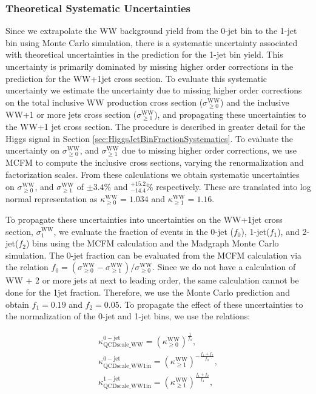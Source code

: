\subsubsection{Theoretical Systematic Uncertainties} 
Since we extrapolate the WW background yield from the 0-jet bin to the 1-jet bin using Monte Carlo
simulation, there is a systematic uncertainty associated with theoretical uncertainties in
the prediction for the 1-jet bin yield. This uncertainty is primarily dominated by missing higher
order corrections in the prediction for the WW+1jet cross section. To evaluate this systematic 
uncertainty we estimate the uncertainty due to missing higher order corrections on the
total inclusive WW production cross section ($\sigma^{\mathrm{WW}}_{\geq 0}$) and the inclusive 
WW+1 or more jets cross section ($\sigma^{\mathrm{WW}}_{\geq 1}$), and propagating these uncertainties 
to the WW+1 jet cross section. The procedure is described in greater detail for the Higgs signal
in Section \ref{sec:HiggsJetBinFractionSystematics}. To evaluate the uncertainty on 
$\sigma^{\mathrm{WW}}_{\geq 0}$, and $\sigma^{\mathrm{WW}}_{\geq 1}$ due to missing higher 
order corrections, we use MCFM \cite{MCFMVVProduction} to compute the inclusive cross sections, 
varying the renormalization and factorization scales. From these calculations we obtain 
systematic uncertainties on $\sigma^{\mathrm{WW}}_{\geq 0}$, and 
$\sigma^{\mathrm{WW}}_{\geq 1}$ of $\pm 3.4\%$ and $^{+15.2}_{-14.4} \%$ respectively. These are translated into
log normal representation as $\kappa^{\mathrm{WW}}_{\geq 0} = 1.034$ and $\kappa^{\mathrm{WW}}_{\geq 1} = 1.16$.

To propagate these uncertainties into uncertainties on the WW+1jet cross section, $\sigma^{\mathrm{WW}}_{1}$,
we evaluate the fraction of events in the 0-jet ($f_{0}$), 1-jet($f_{1}$), and 2-jet($f_{2}$) 
bins using the MCFM calculation and the Madgraph Monte Carlo simulation. The 0-jet fraction can be 
evaluated from the MCFM calculation via the relation 
$f_{0} = (\sigma^{\mathrm{WW}}_{\geq 0} - \sigma^{\mathrm{WW}}_{\geq 1}) / \sigma^{\mathrm{WW}}_{\geq 0}$.
Since we do not have a calculation of WW + 2 or more jets at next to leading order, the same calculation 
cannot be done for the  1jet fraction. Therefore, we use the Monte Carlo prediction and obtain 
$f_{1} = 0.19$ and $f_{2} = 0.05$. To propagate the effect of these uncertainties to the 
normalization of the 0-jet and 1-jet bins, we use the relations:

\begin{eqnarray}
\label{eqn:WWJetBinFractions}
\kappa^{\mathrm{0-jet}}_{\mathrm{QCDscale\_WW}} = (\kappa^{\mathrm{WW}}_{\geq 0})^{\frac{1}{f_{0}}},                 \\
\kappa^{\mathrm{0-jet}}_{\mathrm{QCDscale\_WW1in}} = (\kappa^{\mathrm{WW}}_{\geq 1})^{- \frac{f_{1}+f_{2}}{f_{0}}},  \\
\kappa^{\mathrm{1-jet}}_{\mathrm{QCDscale\_WW1in}} = (\kappa^{\mathrm{WW}}_{\geq 1})^{\frac{f_{1}+f_{2}}{f_{1}}},    \\
\end{eqnarray}

